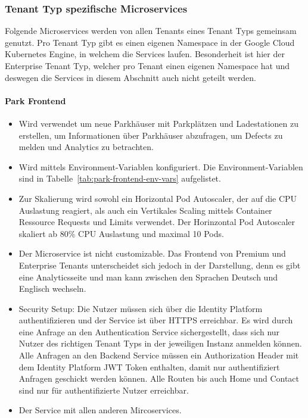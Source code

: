 \subsubsection{Tenant Typ spezifische Microservices}
Folgende Microservices werden von allen Tenants eines Tenant Typs gemeinsam genutzt. Pro Tenant Typ gibt es einen eigenen Namespace in der Google Cloud Kubernetes Engine, in welchem die Services laufen. Besonderheit ist hier der Enterprise Tenant Typ, welcher pro Tenant einen eigenen Namespace hat und deswegen die Services in diesem Abschnitt auch nicht geteilt werden.

\paragraph{Park Frontend}
\begin{itemize}
	\item Wird verwendet um neue Parkhäuser mit Parkplätzen und Ladestationen zu erstellen, um Informationen über Parkhäuser abzufragen, um Defects zu melden und Analytics zu betrachten.
	\item Wird mittels Environment-Variablen konfiguriert. Die Environment-Variablen sind in Tabelle~\ref{tab:park-frontend-env-vars} aufgelistet.
	\item Zur Skalierung wird sowohl ein Horizontal Pod Autoscaler, der auf die CPU Auslastung reagiert, als auch ein Vertikales Scaling mittels Container Ressource Requests und Limits verwendet.
  Der Horinzontal Pod Autoscaler skaliert ab 80\% CPU Auslastung und maximal 10 Pods.
	\item Der Microservice ist nicht customizable. Das Frontend von Premium und Enterprise Tenants unterscheidet sich jedoch in der Darstellung, denn es gibt eine Analyticsseite und man kann zwischen den Sprachen Deutsch und Englisch wechseln.
	\item Security Setup: Die Nutzer müssen sich über die Identity Platform authentifizieren und der Service ist über HTTPS erreichbar. Es wird durch eine Anfrage an den Authentication Service sichergestellt, dass sich nur Nutzer des richtigen Tenant Typs in der jeweiligen Instanz anmelden können. Alle Anfragen an den Backend Service müssen ein Authorization Header mit dem Identity Platform JWT Token enthalten, damit nur authentifiziert Anfragen geschickt werden können. Alle Routen bis auch Home und Contact sind nur für authentifizierte Nutzer erreichbar.
	\item Der Service mit allen anderen Mircoservices.
\end{itemize}

